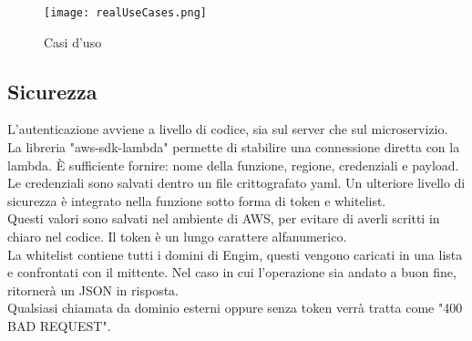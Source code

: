 \documentclass[12pt]{article}
\begin{document}
\begin{figure}[H]
\texttt{[image: realUseCases.png]}
\caption{Casi d'uso}
\end{figure}



\subsection{Sicurezza}
L'autenticazione avviene a livello di codice, sia sul server che sul microservizio.
\\ La libreria "aws-sdk-lambda" permette di stabilire una connessione diretta con la 
lambda. È sufficiente fornire: nome della funzione, regione, credenziali e payload. 
Le credenziali sono salvati dentro un file crittografato yaml. 
Un ulteriore livello di sicurezza è integrato nella funzione sotto forma 
di token e whitelist. 
\\ Questi valori sono salvati nel ambiente di AWS, per evitare di averli 
scritti in chiaro nel codice. Il token è un lungo carattere alfanumerico.
\\ La whitelist contiene tutti i domini di Engim, questi vengono caricati in 
una lista e confrontati con il mittente. 
Nel caso in cui 
l'operazione sia andato a buon fine, ritornerà un JSON in risposta.
\\ Qualsiasi chiamata da dominio esterni oppure senza token verrà tratta come 
"400 BAD REQUEST". 
\end{document}
